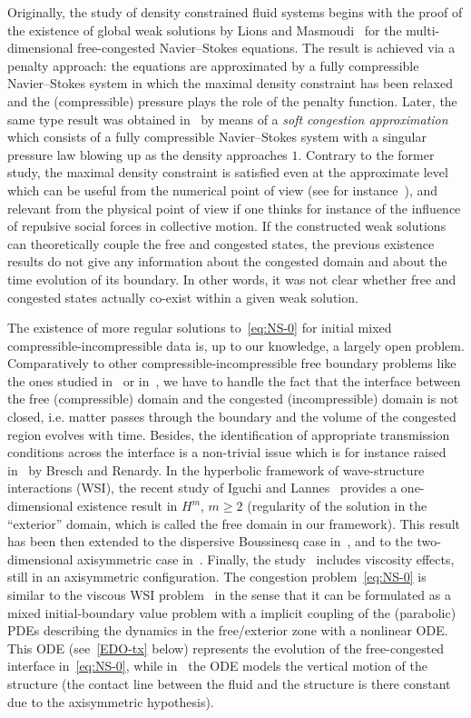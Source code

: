 \documentclass[10pt]{amsart}
\theoremstyle{definition}\newtheorem{defi}[theo]{Definition}\newtheorem{rema}[theo]{Remark}\newtheorem{exam}[theo]{Example}\newtheorem{exem}[theo]{Example}\newtheorem{nota}[theo]{Notation}
\begin{document}
Originally, the study of density constrained fluid systems begins with the proof of the existence of global weak solutions by Lions and Masmoudi~\cite{lions1999} for the multi-dimensional free-congested Navier--Stokes equations. The result is achieved via a penalty approach: the equations are approximated by a fully compressible Navier--Stokes system in which the maximal density constraint has been relaxed and the (compressible) pressure plays the role of the penalty function. Later, the same type result was obtained in~\cite{perrin2015} by means of a \emph{soft congestion approximation} which consists of a fully compressible Navier--Stokes system with a singular pressure law blowing up as the density approaches $1$. Contrary to the former study, the maximal density constraint is satisfied even at the approximate level which can be useful from the numerical point of view (see for instance~\cite{degond2011,PS}), and relevant from the physical point of view if one thinks for instance of the influence of repulsive social forces in collective motion. If the constructed weak solutions can theoretically couple the free and congested states, the previous existence results do not give any information about the congested domain and about the time evolution of its boundary. In other words, it was not clear whether free and congested states actually co-exist within a given weak solution.


The existence of more regular solutions to~\eqref{eq:NS-0} for initial mixed compressible-incompressible data is, up to our knowledge, a largely open problem. Comparatively to other compressible-incompressible free boundary problems like the ones studied in~\cite{shibata2016} or in~\cite{colombo2016}, we have to handle the fact that the interface between the free (compressible) domain and the congested (incompressible) domain is not closed, i.e. matter passes through the boundary and the volume of the congested region evolves with time. Besides, the identification of appropriate transmission conditions across the interface is a non-trivial issue which is for instance raised in~\cite{bresch2017} by Bresch and Renardy. In the hyperbolic framework of wave-structure interactions (WSI), the recent study of Iguchi and Lannes~\cite{iguchi2019} provides a one-dimensional existence result in $H^m$, $m \geq 2$ (regularity of the solution in the ``exterior'' domain, which is called the free domain in our framework). This result has been then extended to the dispersive Boussinesq case in~\cite{bresch2019,beck2021freely}, and to the two-dimensional axisymmetric case in~\cite{bocchi2020}. Finally, the study~\cite{maity2019} includes viscosity effects, still in an axisymmetric configuration. The congestion problem~\eqref{eq:NS-0} is similar to the viscous WSI problem~\cite{maity2019} in the sense that it can be formulated as a mixed initial-boundary value problem with a implicit coupling of the (parabolic) PDEs describing the dynamics in the free/exterior zone with a nonlinear ODE. This ODE (see~\eqref{EDO-tx} below) represents the evolution of the free-congested interface in~\eqref{eq:NS-0}, while in~\cite{maity2019} the ODE models the vertical motion of the structure (the contact line between the fluid and the structure is there constant due to the axisymmetric hypothesis).
\end{document}
